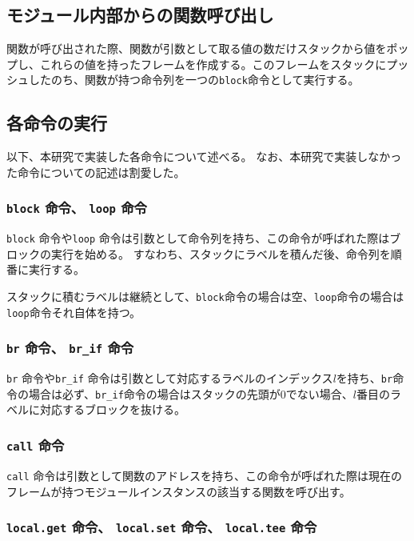 \subsection{モジュール内部からの関数呼び出し}

関数が呼び出された際、関数が引数として取る値の数だけスタックから値をポップし、これらの値を持ったフレームを作成する。このフレームをスタックにプッシュしたのち、関数が持つ命令列を一つの\verb|block|命令として実行する。

\subsection{各命令の実行}

以下、本研究で実装した各命令について述べる。
なお、本研究で実装しなかった命令についての記述は割愛した。

\subsubsection{{\tt block} 命令、 {\tt loop} 命令}

{\tt block} 命令や{\tt loop} 命令は引数として命令列を持ち、この命令が呼ばれた際はブロックの実行を始める。
すなわち、スタックにラベルを積んだ後、命令列を順番に実行する。

スタックに積むラベルは継続として、\verb|block|命令の場合は空、\verb|loop|命令の場合は\verb|loop|命令それ自体を持つ。

\subsubsection{{\tt br} 命令、 {\tt br\_if} 命令}

{\tt br} 命令や{\tt br\_if} 命令は引数として対応するラベルのインデックス$l$を持ち、\verb|br|命令の場合は必ず、\verb|br_if|命令の場合はスタックの先頭が0でない場合、$l$番目のラベルに対応するブロックを抜ける。

\subsubsection{{\tt call} 命令}

{\tt call} 命令は引数として関数のアドレスを持ち、この命令が呼ばれた際は現在のフレームが持つモジュールインスタンスの該当する関数を呼び出す。

\subsubsection{{\tt local.get} 命令、 {\tt local.set} 命令、 {\tt local.tee} 命令}

